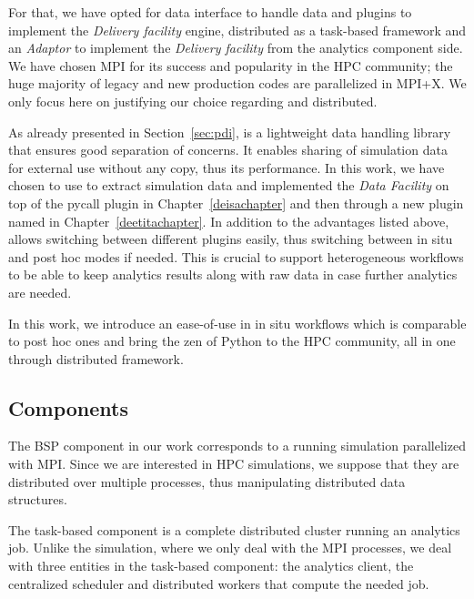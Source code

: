 For that, we have opted for \pdi data interface to handle data and \pdi  plugins to implement the \textit{Delivery facility} engine, \dask distributed as a task-based framework and an \textit{Adaptor} to implement the \textit{Delivery facility} from the analytics component side.
We have chosen MPI for its success and popularity in the HPC community; the huge majority of legacy and new production codes are parallelized in MPI+X. We only focus here on justifying our choice regarding \pdi and \dask distributed.

As already presented in Section~\ref{sec:pdi}, \pdi is a lightweight data handling library that ensures good separation of concerns. It enables sharing of simulation data for external use without any copy, thus its performance. 
In this work, we have chosen to use \pdi to extract simulation data and implemented the \textit{Data Facility} on top of the pycall plugin in Chapter~\ref{deisachapter} and then through a new \pdi plugin named \deisa in Chapter~\ref{deetitachapter}. In addition to the advantages listed above, \pdi allows switching between different plugins easily, thus switching between in situ and post hoc modes if needed. This is crucial to support heterogeneous workflows to be able to keep analytics results along with raw data in case further analytics are needed. 

In this work, we introduce an ease-of-use in in situ workflows which is comparable to post hoc ones and bring the zen of Python to the HPC community, all in one through \dask distributed framework. 


\subsection{Components}
The BSP component in our work corresponds to a running simulation parallelized with MPI. Since we are interested in HPC simulations, we suppose that they are distributed over multiple processes, thus manipulating distributed data structures.   

The task-based component is a complete \dask distributed cluster running an analytics job. Unlike the simulation, where we only deal with the MPI processes, we deal with three entities in the task-based component: the analytics client, the centralized scheduler and distributed workers that compute the needed job. 

